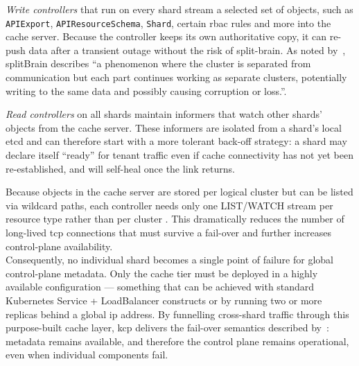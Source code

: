 \documentclass[11pt, a4paper, oneside, listof=totoc]{scrartcl}
\begin{document}
                \begin{enumerate}[label={[\arabic*]:},
                    ref=Challenge~\arabic*,
                    leftmargin=*,
                    itemsep=0.6\baselineskip]

                    \item\label{chal:writeControllers}
                        \textit{Write controllers}
                        that run on every shard stream a selected set of objects, such as
                        \texttt{APIExport}, \texttt{APIResourceSchema}, \texttt{Shard}, certain
                        \gls{rbac} rules and more into the cache server.
                        Because the controller keeps its own authoritative copy, it can re-push data
                        after a transient outage without the risk of split-brain.
                        As noted by~\cite{redhatHA2021}, \gls{splitBrain} describes \enquote{a
                        phenomenon where the cluster is separated from communication but each part
                        continues working as separate clusters, potentially writing to the same data
                        and possibly causing corruption or loss.}.

                    \item\label{chal:readControllers}
                        \textit{Read controllers}
                        on all shards maintain informers that watch other shards' objects from the
                        cache server.
                        These informers are isolated from a shard's local \gls{etcd} and can
                        therefore start with a more tolerant back-off strategy: a shard may declare
                        itself \enquote{ready} for tenant traffic even if cache connectivity has not
                        yet been re-established, and will self-heal once the link returns.
                \end{enumerate}

                Because objects in the cache server are stored per logical cluster but can be listed
                via wildcard paths, each controller needs only one LIST/WATCH stream per resource
                type rather than per cluster \parencite{kcpShardingCacheServer}.
                This dramatically reduces the number of long-lived \gls{tcp} connections that must
                survive a fail-over and further increases control-plane availability.
                \\
                Consequently, no individual shard becomes a single point of failure for global
                control-plane metadata.
                Only the cache tier must be deployed in a highly available configuration ---
                something that can be achieved with standard Kubernetes Service + LoadBalancer
                constructs or by running two or more replicas behind a global \gls{ip} address.
                By funnelling cross-shard traffic through this purpose-built cache layer, \gls{kcp}
                delivers the fail-over semantics described by~\cite{nist800-113}: metadata remains
                available, and therefore the control plane remains operational, even when individual
                components fail.
\end{document}
